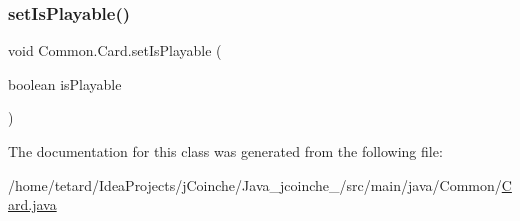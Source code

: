 \subsubsection{\texorpdfstring{set\+Is\+Playable()}{setIsPlayable()}}
{\footnotesize\ttfamily void Common.\+Card.\+set\+Is\+Playable (\begin{DoxyParamCaption}\item[{boolean}]{is\+Playable }\end{DoxyParamCaption})\hspace{0.3cm}{\ttfamily [inline]}}



The documentation for this class was generated from the following file\+:\begin{DoxyCompactItemize}
\item 
/home/tetard/\+Idea\+Projects/j\+Coinche/\+Java\+\_\+jcoinche\+\_/src/main/java/\+Common/\mbox{\hyperlink{Card_8java}{Card.\+java}}\end{DoxyCompactItemize}
